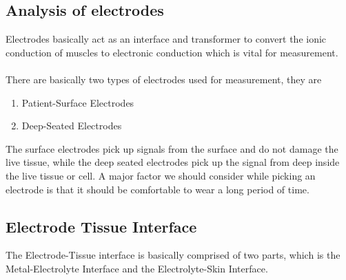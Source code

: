 \documentclass{article}
\begin{document}
\subsection{Analysis of electrodes}
Electrodes basically act as an interface and transformer to convert the ionic conduction of muscles to electronic conduction which is vital for measurement.\\
\\ There are basically two types of electrodes used for measurement, they are
\begin{enumerate}
    \item Patient-Surface Electrodes
    \item Deep-Seated Electrodes
\end{enumerate}
The surface electrodes pick up signals from the surface and do not damage the live tissue, while the deep seated electrodes pick up the signal from deep inside the live tissue or cell. A major factor we should consider while picking an electrode is that it should be comfortable to wear a long period of time.
\subsection{Electrode Tissue Interface}
The Electrode-Tissue interface is basically comprised of two parts, which is the Metal-Electrolyte Interface and the Electrolyte-Skin Interface.
\end{document}
